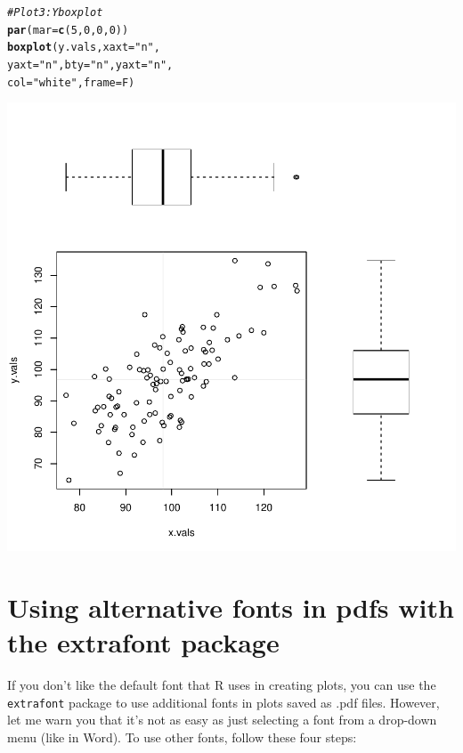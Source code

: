 \documentclass{tufte-book}\usepackage[]{graphicx}\usepackage[]{color}
\makeatletter
\def\maxwidth{ %
  \ifdim\Gin@nat@width>\linewidth
    \linewidth
  \else
    \Gin@nat@width
  \fi
}
\newcommand{\hlnum}[1]{\textcolor[rgb]{0.686,0.059,0.569}{#1}}%
\newcommand{\hlstr}[1]{\textcolor[rgb]{0.192,0.494,0.8}{#1}}%
\newcommand{\hlcom}[1]{\textcolor[rgb]{0.678,0.584,0.686}{\textit{#1}}}%
\newcommand{\hlstd}[1]{\textcolor[rgb]{0.345,0.345,0.345}{#1}}%
\newcommand{\hlkwc}[1]{\textcolor[rgb]{0.333,0.667,0.333}{#1}}%
\newcommand{\hlkwd}[1]{\textcolor[rgb]{0.737,0.353,0.396}{\textbf{#1}}}%
\newenvironment{kframe}{%
 \def\at@end@of@kframe{}%
 \ifinner\ifhmode%
  \def\at@end@of@kframe{\end{minipage}}%
  \begin{minipage}{\columnwidth}%
 \fi\fi%
 \def\FrameCommand##1{\hskip\@totalleftmargin \hskip-\fboxsep
 \colorbox{shadecolor}{##1}\hskip-\fboxsep
     \hskip-\linewidth \hskip-\@totalleftmargin \hskip\columnwidth}%
 \MakeFramed {\advance\hsize-\width
   \@totalleftmargin\z@ \linewidth\hsize
   \@setminipage}}%
 {\par\unskip\endMakeFramed%
 \at@end@of@kframe}
\newenvironment{knitrout}{}{} %
\makeatother
\begin{document}
\begin{footnotesize}
\begin{footnotesize}
\begin{knitrout}
\begin{kframe}
\begin{alltt}
\hlcom{# Plot 3: Y boxplot}
\hlkwd{par}\hlstd{(}\hlkwc{mar} \hlstd{=} \hlkwd{c}\hlstd{(}\hlnum{5}\hlstd{,} \hlnum{0}\hlstd{,} \hlnum{0}\hlstd{,} \hlnum{0}\hlstd{))}
\hlkwd{boxplot}\hlstd{(y.vals,} \hlkwc{xaxt} \hlstd{=} \hlstr{"n"}\hlstd{,}
        \hlkwc{yaxt} \hlstd{=} \hlstr{"n"}\hlstd{,} \hlkwc{bty} \hlstd{=} \hlstr{"n"}\hlstd{,} \hlkwc{yaxt} \hlstd{=} \hlstr{"n"}\hlstd{,}
        \hlkwc{col} \hlstd{=} \hlstr{"white"}\hlstd{,} \hlkwc{frame} \hlstd{= F)}
\end{alltt}
\end{kframe}
\includegraphics[width=\maxwidth]{figure/unnamed-chunk-189-1} 

\end{knitrout}
\end{footnotesize}


\section{Using alternative fonts in pdfs with the extrafont package}

If you don't like the default font that R uses in creating plots, you can use the \texttt{extrafont} package to use additional fonts in plots saved as .pdf files. However, let me warn you that it's not as easy as just selecting a font from a drop-down menu (like in Word). To use other fonts, follow these four steps:


\end{footnotesize}
\end{document}
